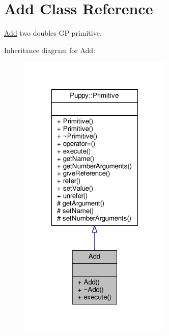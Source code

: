 \hypertarget{classAdd}{}\section{Add Class Reference}
\label{classAdd}


\hyperlink{classAdd}{Add} two doubles G\+P primitive.  




Inheritance diagram for Add\+:
\nopagebreak
\begin{figure}[H]
\begin{center}
\leavevmode
\includegraphics[width=207pt]{classAdd__inherit__graph}
\end{center}
\end{figure}


